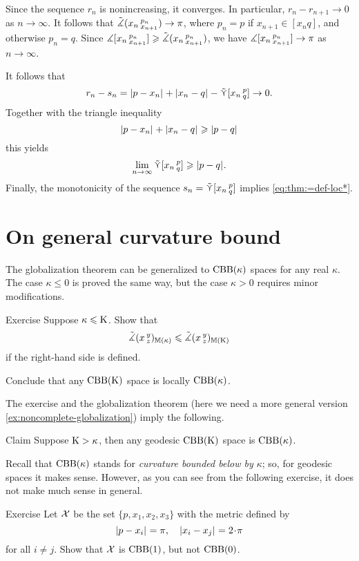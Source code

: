 Since the sequence $r_n$ is nonincreasing, it converges.
In particular, $r_n-r_{n+1}\to 0$ as $n\to\infty$.
It follows that $\tilde\measuredangle(x_n\,{}^{p_n}_{x_{n+1}})\to \pi$,
where $p_n=p$ if $x_{n+1}\in [x_nq]$, and otherwise $p_n=q$.
Since $\measuredangle[x_n\,{}^{p_n}_{x_{n+1}}]\geqslant\tilde\measuredangle(x_n\,{}^{p_n}_{x_{n+1}})$, we have
$\measuredangle[x_n\,{}^{p_n}_{x_{n+1}}]\to \pi$  as $n\to\infty$.

It follows that
\[r_n-s_n=\dist{p}{x_n}{}+\dist{x_n}{q}{}-\side \hinge{x_n}p q\to 0.\] 
Together with the triangle inequality
\[
\dist{p}{x_n}{}+\dist{x_n}{q}{}\ge\dist{p}{q}{}
\]
this yields
\[\lim_{n\to\infty}\side \hinge{x_n}p q\ge \dist{p}{q}{}.\]
Finally, the monotonicity of the sequence $s_n=\mathop{\tilde\curlyvee}\nolimits [x_n\,{}^{p}_{q}]$ implies \ref{eq:thm:=def-loc*}.
\qeds

\section{On general curvature bound}

The globalization theorem  can be generalized to $\mathrm{CBB}(\kappa)$ spaces for any real $\kappa$.
The case $\kappa\le 0$ is proved the same way, but the case $\kappa>0$ requires minor modifications.

\begin{thm}{Exercise}\label{ex:mono-mod-angle}
Suppose $\kappa\leqslant \mathrm{K}$.
Show that 
\[\tilde\measuredangle(x\,{}^{y}_{z})_{\mathbb{M}(\kappa)}\leqslant \tilde\measuredangle(x\,{}^{y}_{z})_{\mathbb{M}(\mathrm{K})}\]
if the right-hand side is defined.

Conclude that any $\mathrm{CBB}(\mathrm{K})$ space is locally $\mathrm{CBB}(\kappa)$.
\end{thm}

The exercise and the globalization theorem (here we need a more general version \ref{ex:noncomplete-globalization}) imply the following.

\begin{thm}{Claim}\label{clm:K>k}
Suppose $\mathrm{K}>\kappa$, then any geodesic $\mathrm{CBB}(\mathrm{K})$ space is  $\mathrm{CBB}(\kappa)$.
\end{thm}

Recall that $\mathrm{CBB}(\kappa)$ stands for \textit{curvature bounded below by $\kappa$}; so, for geodesic spaces it makes sense.
However, as you can see from the following exercise, it does not make much sense in general.

\begin{thm}{Exercise}\label{ex:CBB(1)notitCBB(0)}
Let $\mathcal{X}$ be the set $\{p,x_1,x_2,x_3\}$ with the metric defined by
\[\dist{p}{x_i}{}=\pi,\quad\dist{x_i}{x_j}{}=2\cdot\pi\]
for all $i\ne j$.
Show that $\mathcal{X}$ is $\mathrm{CBB}(1)$, but not $\mathrm{CBB}(0)$.
\end{thm}

